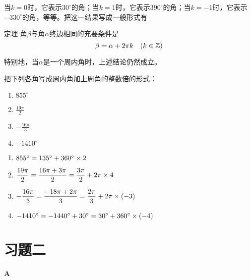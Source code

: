 当$k=0$时，它表示$30^{\circ}$的角；当$k=1$时，它表示$390^{\circ}$的角；当$k=-1$时，它表示$-330^{\circ}$的角，等等。把这一结果写成一般形式有

\begin{thm}
    {定理} 角$\beta$与角$\alpha$终边相同的充要条件是
\[\beta=\alpha+2\pi k\quad (k\in\mathbb{Z})\]
\end{thm}

特别地，当$\alpha$是一个周内角时，上述结论仍然成立。

\begin{example}
    把下列各角写成周内角加上周角的整数倍的形式：
\begin{multicols}{4}
\begin{enumerate}[(1)]
    \item $855^{\circ}$
    \item $\frac{19\pi}{2}$
    \item $-\frac{16\pi}{3}$
    \item $-1410^{\circ}$
\end{enumerate}
\end{multicols}
\end{example}

\begin{solution}
\begin{enumerate}[(1)]
    \item $855^{\circ}=135^{\circ}+360^{\circ}\times 2$
    \item $\dfrac{19\pi}{2}=\dfrac{16\pi+3\pi}{2}=\dfrac{3\pi}{2}+2\pi\times 4$
    \item $-\dfrac{16\pi}{3}=\dfrac{-18\pi+2\pi}{3}=\dfrac{2\pi}{3}+2\pi\times (-3)$
    \item $-1410^{\circ}=-1440^{\circ}+30^{\circ}=30^{\circ}+360^{\circ}\times (-4)$
\end{enumerate}
\end{solution}

\section*{习题二}
\begin{center}
    \bfseries A
\end{center}

